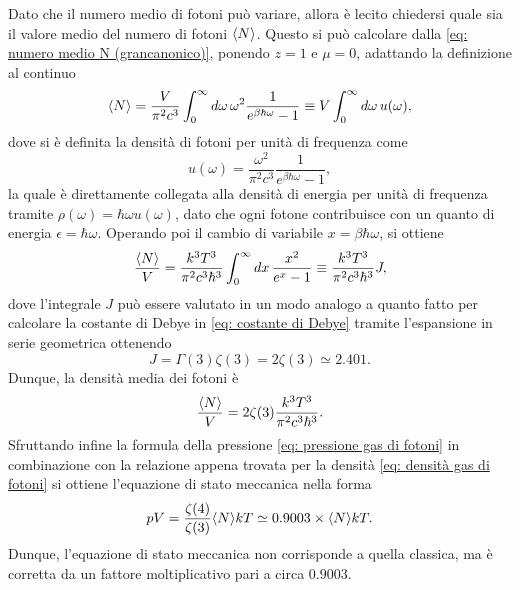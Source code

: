 Dato che il numero medio di fotoni può variare, allora è lecito chiedersi quale sia il valore medio del numero di fotoni $\langle N \rangle$. Questo si può calcolare dalla \eqref{eq: numero medio N (grancanonico)}, ponendo $z = 1$ e $\mu = 0$, adattando la definizione al continuo
\begin{equation}
    \langle N \rangle = \frac{V}{\pi^2c^3}\int_0^\infty d\omega\,\omega^2\frac{1}{e^{\beta\hbar\omega} - 1} \equiv V\int_0^\infty d\omega\, u(\omega),
\end{equation}
dove si è definita la densità di fotoni per unità di frequenza come
\begin{equation}
    u(\omega) = \frac{\omega^2}{\pi^2c^3}\frac{1}{e^{\beta\hbar\omega} - 1},
\end{equation}
la quale è direttamente collegata alla densità di energia per unità di frequenza tramite $\rho(\omega) = \hbar\omega u(\omega)$, dato che ogni fotone contribuisce con un quanto di energia $\epsilon = \hbar\omega$. Operando poi il cambio di variabile $x = \beta\hbar\omega$, si ottiene
\begin{equation}
    \frac{\langle N \rangle}{V} = \frac{k^3T^3}{\pi^2c^3\hbar^3}\int_0^\infty dx\,\frac{x^2}{e^x - 1} \equiv \frac{k^3T^3}{\pi^2c^3\hbar^3}J,
\end{equation}
dove l'integrale $J$ può essere valutato in un modo analogo a quanto fatto per calcolare la costante di Debye in \eqref{eq: costante di Debye} tramite l'espansione in serie geometrica ottenendo
\begin{equation}
     J = \Gamma(3)\zeta(3) = 2\zeta(3) \simeq 2.401.
\end{equation}
Dunque, la densità media dei fotoni è
\begin{equation}
\label{eq: densità gas di fotoni}
    \frac{\langle N \rangle}{V} = 2\zeta(3)\frac{k^3T^3}{\pi^2c^3\hbar^3}.
\end{equation}
Sfruttando infine la formula della pressione \eqref{eq: pressione gas di fotoni} in combinazione con la relazione appena trovata per la densità \eqref{eq: densità gas di fotoni} si ottiene l'equazione di stato meccanica nella forma
\begin{equation}
    pV = \frac{\zeta(4)}{\zeta(3)}\langle N \rangle kT \simeq 0.9003\times \langle N \rangle kT.
\end{equation}
Dunque, l'equazione di stato meccanica non corrisponde a quella classica, ma è corretta da un fattore moltiplicativo pari a circa $0.9003$.


